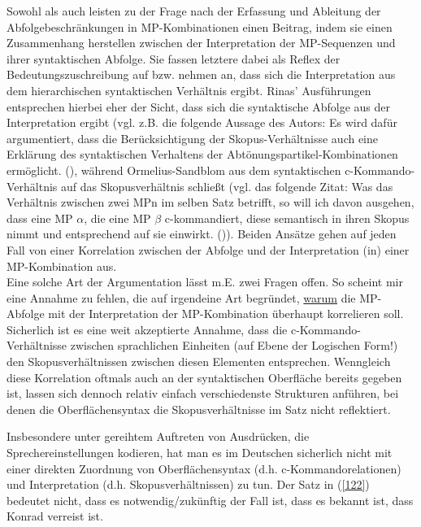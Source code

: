 \noindent 
Sowohl \citet{Ormelius-Sandblom1997} als auch \citet{Rinas2006, Rinas2007} leisten zu der Frage nach der Erfassung und Ableitung der Abfolgebeschränkungen in MP-Kombinationen einen Beitrag, indem sie einen Zusammenhang herstellen zwi\-schen der Interpretation der MP-Sequenzen und ihrer syntaktischen Abfolge. Sie fassen letztere dabei als Reflex der Bedeutungszuschreibung auf bzw. nehmen an, dass sich die Interpretation aus dem hierarchischen syntaktischen Verhältnis ergibt. Rinas' Ausführungen entsprechen hierbei eher der Sicht, dass sich die syntaktische Abfolge aus der Interpretation ergibt (vgl. z.B. die folgende Aussage des Autors:  \glqq Es wird dafür argumentiert, dass die Berücksichtigung der Skopus-Verhältnisse  auch eine Erklärung des syntaktischen Verhaltens der Abtönungspartikel-Kombinationen ermöglicht.\grqq{} (\citealt[408]{Rinas2007}), während Or\-melius-Sandblom aus dem syntaktischen c-Kommando-Verhältnis  auf das Skopusverhältnis schließt (vgl. das folgende Zitat:  \glqq Was das Verhältnis zwischen zwei MPn im selben Satz betrifft, so will ich davon ausgehen, dass eine MP $\alpha$, die eine MP $\beta$ c-kommandiert, diese semantisch in ihren Skopus nimmt und entsprechend auf sie einwirkt.\grqq{} (\citealt[92-93]{Ormelius-Sandblom1997})). Beiden Ansätze gehen auf jeden Fall von einer Korrelation zwischen der Abfolge und der Interpretation (in) einer MP-Kombination aus.\\

\noindent
Eine solche Art der Argumentation lässt m.E. zwei Fragen offen. So scheint mir eine Annahme zu fehlen, die auf irgendeine Art begründet, \underline{warum} die MP-Abfolge mit der Interpretation der MP-Kombination überhaupt korrelieren soll. Sicherlich ist es eine weit akzeptierte Annahme, dass die c-Kommando-Verhältnis\-se zwischen sprachlichen Einheiten (auf Ebene der Logischen Form!)  den Skopusverhältnissen zwischen diesen Elementen entsprechen. Wenngleich diese Korrelation oftmals auch an der syntaktischen Oberfläche bereits gegeben ist, lassen sich dennoch relativ einfach verschiedenste Strukturen anführen, bei denen die Oberflächensyntax die Skopusverhältnisse im Satz nicht reflektiert.

Insbesondere unter gereihtem Auftreten von Ausdrücken, die Sprechereinstellungen kodieren, hat man es im Deutschen sicherlich nicht mit einer direkten Zuordnung von Oberflächensyntax (d.h. c-Kommandorelationen) und Interpretation (d.h. Skopusverhältnissen) zu tun. Der Satz in (\ref{122}) bedeutet nicht, dass es notwendig/zukünftig der Fall ist, dass es bekannt ist, dass Konrad verreist ist.

